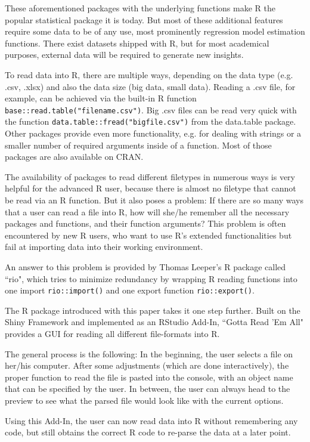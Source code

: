 \documentclass[12pt]{article} %
\newcommand{\li}{\lstinline}
\begin{document}
These aforementioned packages with the underlying functions make R the popular statistical package it is today. But most of these additional features require some data to be of any use, most prominently regression model estimation functions. There exist datasets shipped with R, but for most academical purposes, external data will be required to generate new insights.

To read data into R, there are multiple ways, depending on the data type (e.g. .csv, .xlsx) and also the data size (big data, small data). Reading a .csv file, for example, can be achieved via the built-in R function \li{base::read.table("filename.csv")}. Big .csv files can be read very quick with the function \li{data.table::fread("bigfile.csv")} from the data.table package. Other packages provide even more functionality, e.g. for dealing with strings or a smaller number of required arguments inside of a function. Most of those packages are also available on CRAN. 

The availability of packages to read different filetypes in numerous ways is very helpful for the advanced R user, because there is almost no filetype that cannot be read via an R function. But it also poses a problem: If there are so many ways that a user can read a file into R, how will she/he remember all the necessary packages and functions, and their function arguments? This problem is often encountered by new R users, who want to use R's extended functionalities but fail at importing data into their working environment.

An answer to this problem is provided by Thomas Leeper's R package called ``rio", which tries to minimize redundancy by wrapping R reading functions into one import \li{rio::import()} and one export function \li{rio::export()}. 

The R package introduced with this paper takes it one step further. Built on the Shiny Framework and implemented as an RStudio Add-In, ``Gotta Read 'Em All" provides a GUI for reading all different file-formats into R. 

The general process is the following: In the beginning, the user selects a file on her/his computer. After some adjustments (which are done interactively), the proper function to read the file is pasted into the console, with an object name that can be specified by the user. In between, the user can always head to the preview to see what the parsed file would look like with the current options.

Using this Add-In, the user can now read data into R without remembering any code, but still obtains the correct R code to re-parse the data at a later point. 
\end{document}
